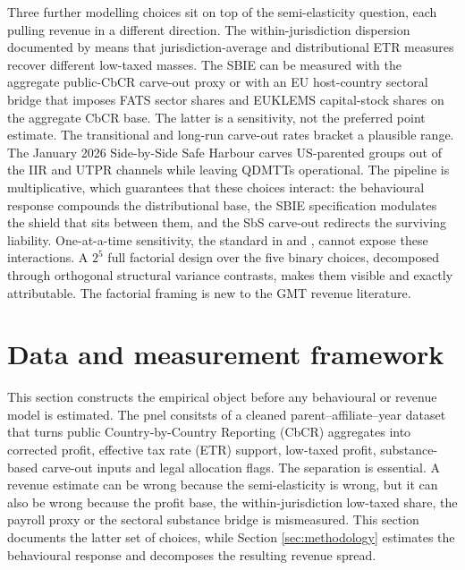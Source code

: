 \documentclass[11pt,a4paper]{article}
\begin{document}
Three further modelling choices sit on top of the semi-elasticity question, each pulling revenue in a different direction. The within-jurisdiction dispersion documented by \citet{hugger2026} means that jurisdiction-average and distributional ETR measures recover different low-taxed masses. The SBIE can be measured with the aggregate public-CbCR carve-out proxy or with an EU host-country sectoral bridge that imposes FATS sector shares and EUKLEMS capital-stock shares on the aggregate CbCR base. The latter is a sensitivity, not the preferred point estimate. The transitional and long-run carve-out rates bracket a plausible range. The January 2026 Side-by-Side Safe Harbour carves US-parented groups out of the IIR and UTPR channels while leaving QDMTTs operational. The pipeline is multiplicative, which guarantees that these choices interact: the behavioural response compounds the distributional base, the SBIE specification modulates the shield that sits between them, and the SbS carve-out redirects the surviving liability. One-at-a-time sensitivity, the standard in \citet{barake2022} and \citet{hugger2026}, cannot expose these interactions. A $2^5$ full factorial design over the five binary choices, decomposed through orthogonal structural variance contrasts, makes them visible and exactly attributable. The factorial framing is new to the GMT revenue literature.

\newpage

\section{Data and measurement framework}\label{data}\label{sec:data}\label{sec:descriptive}

This section constructs the empirical object before any behavioural or revenue model is estimated. The pnel consitsts of a cleaned parent--affiliate--year dataset that turns public Country-by-Country Reporting (CbCR) aggregates into corrected profit, effective tax rate (ETR) support, low-taxed profit, substance-based carve-out inputs and legal allocation flags. The separation is essential. A revenue estimate can be wrong because the semi-elasticity is wrong, but it can also be wrong because the profit base, the within-jurisdiction low-taxed share, the payroll proxy or the sectoral substance bridge is mismeasured. This section documents the latter set of choices, while Section \ref{sec:methodology} estimates the behavioural response and decomposes the resulting revenue spread.
\end{document}
